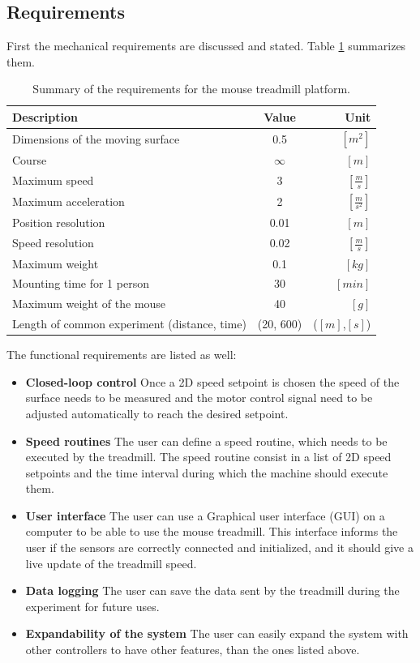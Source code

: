 \documentclass[12pt,a4paper]{article}
\begin{document}
\subsection{Requirements}
First the mechanical requirements are discussed and stated. Table \ref{tab:Requirements} summarizes them.
\begin{table}[H]
	\centering
	\begin{tabular}{l||c|r} 
		\textbf{Description}&\textbf{Value}  &\textbf{Unit}  \\ 
		\hline
		\hline 
		Dimensions of the moving surface & 0.5 & $[m^2]$ \\ 
		\hline 
		Course & $\infty$  & $[m]$  \\ 
		\hline 
		Maximum speed & 3 & $[\frac{m}{s}]$ \\ 
		\hline 
		Maximum acceleration & 2 & $[\frac{m}{s^2}]$  \\ 
		\hline 
		Position resolution & 0.01 & $[m]$  \\ 
		\hline 
		Speed resolution & 0.02  & $[\frac{m}{s}]$  \\ 
		\hline 
		Maximum weight & 0.1  & $[kg]$  \\  
		\hline 
		Mounting time for 1 person & 30 & $[min]$  \\
		\hline 
		Maximum weight of the mouse & 40  & $[g]$ \\
		\hline 
		Length of common experiment (distance, time) & (20, 600)  & ($[m]$,$[s]$)  \\
	\end{tabular} 
	\caption{Summary of the requirements for the mouse treadmill platform.}
	\label{tab:Requirements}
\end{table}
The functional requirements are listed as well:
\begin{itemize}
	\item \textbf{Closed-loop control} Once a 2D speed setpoint is chosen the speed of the surface needs to be measured and the motor control signal need to be adjusted automatically to reach the desired setpoint. 
	\item \textbf{Speed routines} The user can define a speed routine, which needs to be executed by the treadmill. The speed routine consist in a list of 2D speed setpoints and the time interval during which the machine should execute them.
	\item \textbf{User interface} The user can use a Graphical user interface (GUI) on a computer to be able to use the mouse treadmill. This interface informs the user if the sensors are correctly connected and initialized, and it should give a live update of the treadmill speed.
	\item \textbf{Data logging} The user can save the data sent by the treadmill during the experiment for future uses. 
	\item \textbf{Expandability of the system} The user can easily expand the system with other controllers to have other features, than the ones listed above.
\end{itemize}
\end{document}
